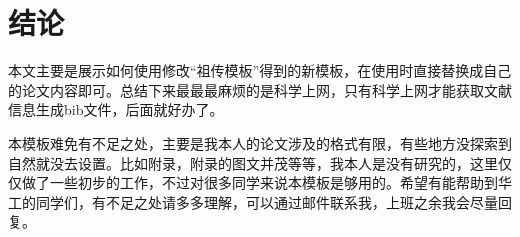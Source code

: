 \chapter{结\texorpdfstring{\quad}{}论}
本文主要是展示如何使用修改“祖传模板”得到的新模板，在使用时直接替换成自己的论文内容即可。总结下来最最最麻烦的是科学上网，只有科学上网才能获取文献信息生成bib文件，后面就好办了。

本模板难免有不足之处，主要是我本人的论文涉及的格式有限，有些地方没探索到自然就没去设置。比如附录，附录的图文并茂等等，我本人是没有研究的，这里仅仅做了一些初步的工作，不过对很多同学来说本模板是够用的。希望有能帮助到华工的同学们，有不足之处请多多理解，可以通过邮件联系我，上班之余我会尽量回复。